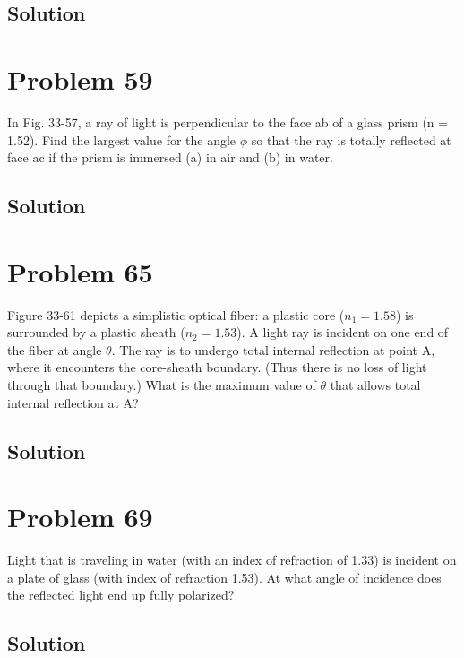 \documentclass[12pt]{article}
\begin{document}
        \subsection{Solution}

    \pagebreak
    \section{Problem 59}
        In Fig. 33-57, a ray of light is perpendicular to the face ab of a glass prism (n = 1.52).
        Find the largest value for the angle $\phi$ so that the ray is totally reflected at face ac if the prism is immersed (a) in air and (b) in water.

        \subsection{Solution}

    \pagebreak
    \section{Problem 65}
        Figure 33-61 depicts a simplistic optical fiber: a plastic core ($n_1 = 1.58$) is surrounded by a plastic sheath ($n_2 = 1.53$). 
        A light ray is incident on one end of the fiber at angle $\theta$. 
        The ray is to undergo total internal reflection at point A, where it encounters the core-sheath boundary. 
        (Thus there is no loss of light through that boundary.) 
        What is the maximum value of $\theta$ that allows total internal reflection at A?

        \subsection{Solution}

    \pagebreak
    \section{Problem 69}
        Light that is traveling in water (with an index of refraction of 1.33) is incident on a plate of glass (with index of refraction 1.53). 
        At what angle of incidence does the reflected light end up fully polarized?

        \subsection{Solution}
\end{document}
